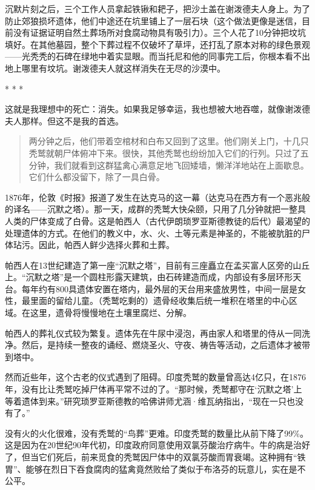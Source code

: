 \documentclass[12pt,oneside]{book}
\begin{document}
沉默片刻之后，三个工作人员拿起铁锹和耙子，把沙土盖在谢泼德夫人身上。为了防止郊狼损坏遗体，他们中途还在坑里铺上了一层石块（这个做法更像是迷信，目前没有证据证明自然土葬场所对食腐动物具有吸引力）。三个人花了10分钟把坟坑填好。在其他墓园，整个下葬过程不仅破坏了草坪，还打乱了原本对称的绿色景观——光秃秃的石碑在绿地中着实显眼。而当托尼和他的同事完工后，你根本看不出地上哪里有坟坑。谢泼德夫人就这样消失在无尽的沙漠中。

\begin{center}
* * *
\end{center}

这就是我理想中的死亡：消失。如果我足够幸运，我也想被大地吞噬，就像谢泼德夫人那样。但这不是我的首选。

\begin{quotation}
两分钟之后，他们带着空棺材和白布又回到了这里。他们刚关上门，十几只秃鹫就朝尸体俯冲下来。很快，其他秃鹫也纷纷加入它们的行列。只过了五分钟，我们就看到这群猛禽心满意足地飞回矮墙，懒洋洋地站在上面歇息。它们什么都没留下，除了一具白骨。
\end{quotation}

1876年，伦敦《时报》报道了发生在达克马的这一幕（达克马在西方有一个恶兆般的译名——沉默之塔）。那一天，成群的秃鹫大快朵颐，只用了几分钟就把一整具人类的尸体变成了白骨。这是帕西人（古代伊朗琐罗亚斯德教徒的后代）最渴望的处理遗体的方式。在他们的教义中，水、火、土等元素是神圣的，不能被肮脏的尸体玷污。因此，帕西人鲜少选择火葬和土葬。

帕西人在13世纪建造了第一座“沉默之塔”，目前有三座矗立在孟买富人区旁的山丘上。“沉默之塔”是一个圆柱形露天建筑，由石砖建造而成，内部设有多层环形天台。每年约有800具遗体安置在塔内，最外层的天台用来盛放男性，中间一层是女性，最里面的留给儿童。（秃鹫吃剩的）遗骨经收集后统一堆积在塔里的中心区域。在这里，遗骨将慢慢地在土壤里腐烂、分解。

帕西人的葬礼仪式较为繁复。遗体先在牛尿中浸泡，再由家人和塔里的侍从一同洗净。然后，是持续一整夜的诵经、燃烧圣火、守夜、祷告等活动，之后遗体才被带到塔中。

然而近些年，这个古老的仪式遇到了阻碍。印度秃鹫的数量曾高达4亿只，在1876年，没有比让秃鹫吃掉尸体再平常不过的了。“那时候，秃鹫都守在‘沉默之塔’上等着遗体到来。”研究琐罗亚斯德教的哈佛讲师尤涵·维瓦纳指出，“现在一只也没有了。”

没有火的火化很难，没有秃鹫的“鸟葬”更难。印度秃鹫的数量比从前下降了99\%。这是因为在20世纪90年代初，印度政府同意使用双氯芬酸治疗病牛。牛的病是治好了，但当它们死后，前来觅食的秃鹫因尸体中的双氯芬酸而胃衰竭。这种拥有“铁胃”、能够在烈日下吞食腐肉的猛禽竟然败给了类似于布洛芬的玩意儿，实在是不公平。
\end{document}
